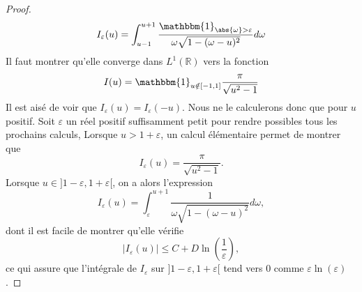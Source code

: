 \documentclass[11pt,a4paper]{article}
\begin{document}
\begin{Lem}
\begin{proof}
\begin{align*}
I_\varepsilon(u) = \int_{u-1}^{u+1} \dfrac{\mathbbm{1}_{\abs{\omega}> \varepsilon}}{\omega\sqrt{1-(\omega-u)^2}}d\omega
\end{align*}
Il faut montrer qu'elle converge dans $L^1(\mathbb{R})$ vers la fonction 
\[I(u) = \mathbbm{1}_{u \notin [-1,1]} \dfrac{\pi}{\sqrt{u^2-1}}\]
Il est aisé de voir que $I_\varepsilon(u) = I_{\varepsilon}(-u)$. Nous ne le calculerons donc que pour $u$ positif. Soit $\varepsilon$ un réel positif suffisamment petit pour rendre possibles tous les prochains calculs, Lorsque $u>1+\varepsilon$, un calcul élémentaire permet de montrer que 
\[I_\varepsilon(u) = \dfrac{\pi}{\sqrt{u^2-1}}.\]
Lorsque $u \in ]1-\varepsilon,1+\varepsilon[$, on a alors l'expression
\[I_\varepsilon(u) = \int_{\varepsilon}^{u+1} \dfrac{1}{\omega\sqrt{1-(\omega-u)^2}}d\omega,\]
dont il est facile de montrer qu'elle vérifie 
\[|I_\varepsilon(u)| \leq C + D\ln\left(\dfrac{1}{\varepsilon}\right),\]
ce qui assure que l'intégrale de $I_\varepsilon$ sur $]1-\varepsilon,1+\varepsilon[$ tend vers 0 comme $\varepsilon\ln(\varepsilon)$. 


\end{proof}
\end{Lem}
\end{document}
